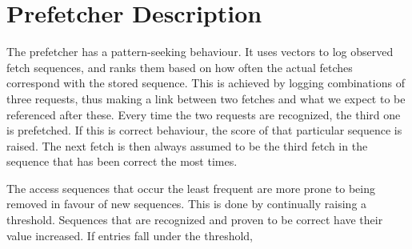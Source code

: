 \section*{Prefetcher Description}

The prefetcher has a pattern-seeking behaviour. It uses vectors to log observed fetch sequences, and ranks them based on how often the actual fetches correspond with the stored sequence. This is achieved by logging combinations of three requests, thus making a link between two fetches and what we expect to be referenced after these. Every time the two requests are recognized, the third one is prefetched. If this is correct behaviour, the score of that particular sequence is raised. The next fetch is then always assumed to be the third fetch in the sequence that has been correct the most times.


The access sequences that occur the least frequent are more prone to being removed in favour of new sequences. This is done by continually raising a threshold. Sequences that are recognized and proven to be correct have their value increased. If entries fall under the threshold, 